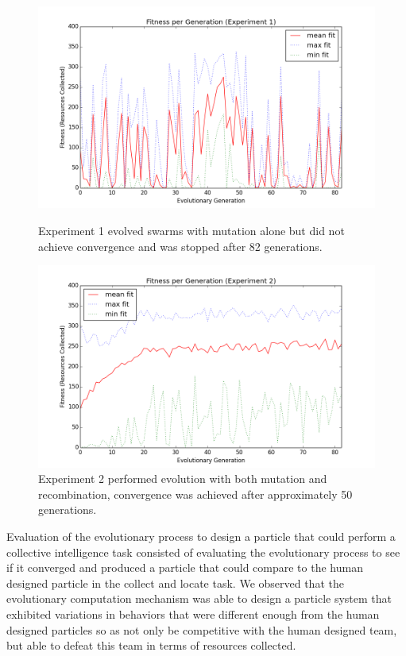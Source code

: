 \documentclass[conference,final]{IEEEtran}
\begin{document}
\begin{figure}
\centering
\begin{minipage}{0.5\textwidth}
	\centering
    \includegraphics[width=\textwidth]{figures/meanfit_experiment1}
    \caption[width=0.45\textwidth]{Experiment 1 evolved swarms with mutation alone but did not \\ achieve convergence and was stopped after 82 generations.}
    \label{fig:meanfit1}
\end{minipage}%
\begin{minipage}{0.5\textwidth}
	\centering
    \includegraphics[width=\textwidth]{figures/meanfit_experiment2}
    \caption[width=0.45\textwidth]{Experiment 2 performed evolution with both mutation and recombination, convergence was achieved after approximately 50 generations.}
    \label{fig:meanfit2}
\end{minipage}
\end{figure}

Evaluation of the evolutionary process to design a particle that could perform a collective intelligence task consisted of evaluating the evolutionary process to see if it converged and produced a particle that could compare to the human designed particle in the collect and locate task. We observed that the evolutionary computation mechanism was able to design a particle system that exhibited variations in behaviors that were different enough from the human designed particles so as not only be competitive with the human designed team, but able to defeat this team in terms of resources collected.
\end{document}
